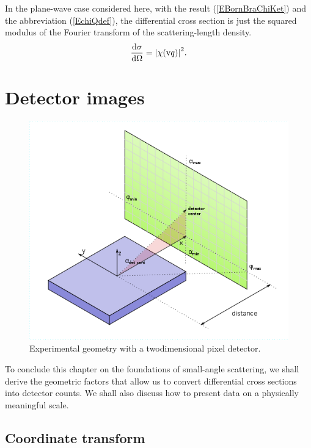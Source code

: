 In the plane-wave case considered here,
with the result (\ref{EBornBraChiKet}) and the abbreviation (\ref{EchiQdef}),
the differential cross section is just the squared modulus
of the Fourier transform 
%
of the scattering-length density.
\begin{equation}\label{Ecross1}
  \frac{\text{d}\sigma}{\text{d}\Omega}
  = {\left| \chi(\text{v}{q}) \right|}^2.
\end{equation}


\section{Detector images}\label{SdetImg}

\def\tc{\text{c}}

\begin{figure}[t]
\begin{center}
\includegraphics[width=.5\textwidth]{fig/drawing/experimental_geometry.png}
\end{center}
\caption{Experimental geometry with a twodimensional pixel detector.}
\label{FexpGeom}
\end{figure}

To conclude this chapter on the foundations of small-angle scattering,
we shall derive the geometric factors
that allow us to convert differential cross sections into detector counts.
We shall also discuss how to present data on a physically meaningful scale.

\subsection{Coordinate transform}

